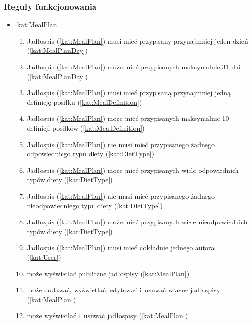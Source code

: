\subsubsection{Reguły funkcjonowania}\label{subsubsec:database:mealplans:functionalRules}

\begin{itemize}[label={\textbf{Reguły dla}}, wide, labelwidth=!, labelindent=0pt]
    \setlength\itemsep{1.75em}
    \item\ref{kat:MealPlan}\mynobreakpar
    \begin{enumerate}[label={\textbf{REG/4/\protect\twodigits{\arabic{enumi}}}}, wide, labelwidth=!, align=left, leftmargin=3cm]
        \item Jadłospis (\ref{kat:MealPlan}) musi mieć przypisany przynajmniej jeden dzień (\ref{kat:MealPlanDay})
        \item Jadłospis (\ref{kat:MealPlan}) może mieć przypisanych maksymalnie 31 dni (\ref{kat:MealPlanDay})
        \item Jadłospis (\ref{kat:MealPlan}) musi mieć przypisaną przynajmniej jedną definicję posiłku (\ref{kat:MealDefinition})
        \item Jadłospis (\ref{kat:MealPlan}) może mieć przypisanych maksymalnie 10 definicji posiłków (\ref{kat:MealDefinition})
        \item Jadłospis (\ref{kat:MealPlan}) nie musi mieć przypisanego żadnego odpowiedniego typu diety (\ref{kat:DietType})
        \item Jadłospis (\ref{kat:MealPlan}) może mieć przypisanych wiele odpowiednich typów diety (\ref{kat:DietType})
        \item Jadłospis (\ref{kat:MealPlan}) nie musi mieć przypisanego żadnego nieodpowiedniego typu diety (\ref{kat:DietType})
        \item Jadłospis (\ref{kat:MealPlan}) może mieć przypisanych wiele nieodpowiednich typów diety (\ref{kat:DietType})
        \item Jadłospis (\ref{kat:MealPlan}) musi mieć dokładnie jednego autora (\ref{kat:User})
        \item {} może wyświetlać publiczne jadłospisy (\ref{kat:MealPlan})
        \item {} może dodawać, wyświetlać, edytować i~usuwać własne jadłospisy (\ref{kat:MealPlan})
        \item {} może wyświetlać i~usuwać jadłospisy (\ref{kat:MealPlan})
    \end{enumerate}

\end{itemize}
